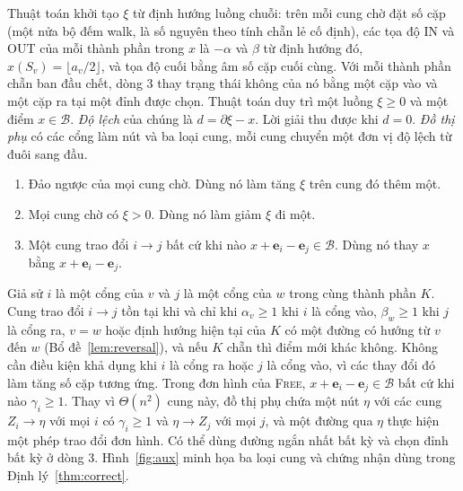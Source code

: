 \documentclass[pdflatex,sn-mathphys-num]{sn-jnl}
\theoremstyle{thmstyleone}
\theoremstyle{thmstyletwo}
\theoremstyle{thmstylethree}
\newcommand{\cB}{\mathcal{B}}
\newcommand{\e}{\mathbf{e}}
\newcommand{\FREE}{\textup{\textsc{Free}}}
\begin{document}
Thuật toán khởi tạo $\xi$ từ định hướng luồng chuỗi: trên mỗi cung chờ đặt số cặp (một nửa bộ đếm walk, là số nguyên theo tính chẵn lẻ cố định), các tọa độ IN và OUT của mỗi thành phần trong $x$ là $-\alpha$ và $\beta$ từ định hướng đó, $x(S_v)=\lfloor a_v/2\rfloor$, và tọa độ cuối bằng âm số cặp cuối cùng. Với mỗi thành phần chẵn ban đầu chết, dòng 3 thay trạng thái không của nó bằng một cặp vào và một cặp ra tại một đỉnh được chọn. Thuật toán duy trì một luồng $\xi\ge0$ và một điểm $x\in\cB$. \emph{Độ lệch} của chúng là $d=\partial\xi-x$. Lời giải thu được khi $d=0$. \emph{Đồ thị phụ} có các cổng làm nút và ba loại cung, mỗi cung chuyển một đơn vị độ lệch từ đuôi sang đầu.
\begin{enumerate}
\item[(1)] Đảo ngược của mọi cung chờ. Dùng nó làm tăng $\xi$ trên cung đó thêm một.
\item[(2)] Mọi cung chờ có $\xi>0$. Dùng nó làm giảm $\xi$ đi một.
\item[(3)] Một cung trao đổi $i\to j$ bất cứ khi nào $x+\e_i-\e_j\in\cB$. Dùng nó thay $x$ bằng $x+\e_i-\e_j$.
\end{enumerate}
Giả sử $i$ là một cổng của $v$ và $j$ là một cổng của $w$ trong cùng thành phần $K$. Cung trao đổi $i\to j$ tồn tại khi và chỉ khi $\alpha_v\ge1$ khi $i$ là cổng vào, $\beta_w\ge1$ khi $j$ là cổng ra, $v=w$ hoặc định hướng hiện tại của $K$ có một đường có hướng từ $v$ đến $w$ (Bổ đề~\ref{lem:reversal}), và nếu $K$ chẵn thì điểm mới khác không. Không cần điều kiện khả dụng khi $i$ là cổng ra hoặc $j$ là cổng vào, vì các thay đổi đó làm tăng số cặp tương ứng. Trong đơn hình của \FREE{}, $x+\e_i-\e_j\in\cB$ bất cứ khi nào $\gamma_i\ge1$. Thay vì $\Theta(n^2)$ cung này, đồ thị phụ chứa một nút $\eta$ với các cung $Z_i\to\eta$ với mọi $i$ có $\gamma_i\ge1$ và $\eta\to Z_j$ với mọi $j$, và một đường qua $\eta$ thực hiện một phép trao đổi đơn hình. Có thể dùng đường ngắn nhất bất kỳ và chọn đỉnh bất kỳ ở dòng 3. Hình~\ref{fig:aux} minh họa ba loại cung và chứng nhận dùng trong Định lý~\ref{thm:correct}.
\end{document}
